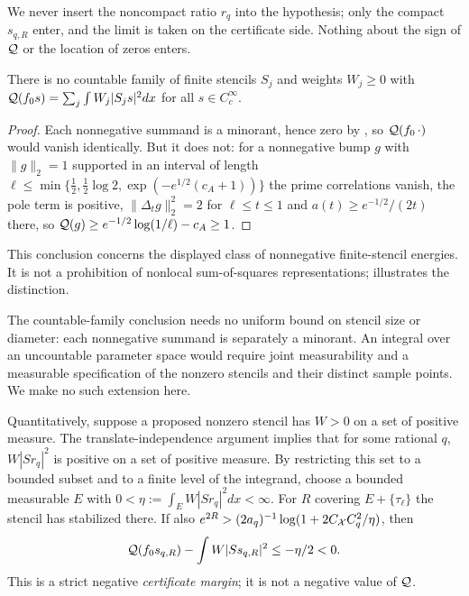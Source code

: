We never insert the noncompact ratio $r_q$ into the hypothesis; only the compact $s_{q,R}$ enter, and the limit is taken
on the certificate side. Nothing about the sign of $\mathcal Q$ or the location of zeros enters.

\begin{corollary}\label{cor:noCSS}
There is no countable family of finite stencils $S_j$ and weights $W_j\ge0$ with
$\mathcal Q(f_0s)=\sum_j\int W_j|S_js|^2dx$ for all $s\in C_c^\infty$.
\end{corollary}
\begin{proof}
Each nonnegative summand is a minorant, hence zero by , so $\mathcal Q(f_0\,\cdot)$ would vanish identically.
But it does not: for a nonnegative bump $g$ with $\|g\|_2=1$ supported in an interval of length
$\ell\le\min\{\tfrac12,\tfrac12\log2,\exp(-e^{1/2}(c_A+1))\}$ the prime correlations vanish, the pole term is positive,
$\|\Delta_tg\|_2^2=2$ for $\ell\le t\le1$ and $a(t)\ge e^{-1/2}/(2t)$ there, so $\mathcal Q(g)\ge e^{-1/2}\log(1/\ell)-c_A\ge1$.
\end{proof}
This conclusion concerns the displayed class of nonnegative
finite-stencil energies. It is not a prohibition of nonlocal
sum-of-squares representations;  illustrates the
distinction.

\begin{remark}
The countable-family conclusion needs no uniform bound on stencil
size or diameter: each nonnegative summand is separately a minorant.
An integral over an uncountable parameter space would require joint
measurability and a measurable specification of the nonzero stencils
and their distinct sample points. We make no such extension here.
\end{remark}

Quantitatively, suppose a proposed nonzero stencil has $W>0$ on a
set of positive measure. The translate-independence argument implies
that for some rational $q$, $W|Sr_q|^2$ is positive on a set of
positive measure. By restricting this set to a bounded subset and
to a finite level of the integrand, choose a bounded measurable $E$
with $0<\eta:=\int_EW|Sr_q|^2dx<\infty$.
For $R$ covering $E+\{\tau_\ell\}$ the stencil has stabilized there.
If also
$e^{2R}>(2a_q)^{-1}\log(1+2C_{\mathcal X}C_q^2/\eta)$, then
\begin{equation}\label{eq:certkill}
 \mathcal Q(f_0s_{q,R})-\int W|Ss_{q,R}|^2\le-\eta/2<0 .
\end{equation}
This is a strict negative \emph{certificate margin}; it is not a negative value of $\mathcal Q$.

